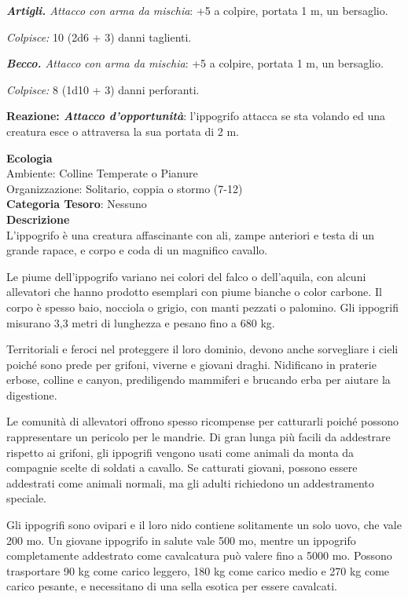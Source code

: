 \begin{multicols}{2}
{\emph{\textbf{Artigli.} Attacco con arma da mischia}: +5 a colpire, portata 1 m, un bersaglio.

\emph{Colpisce:} 10 (2d6 + 3) danni taglienti.

\emph{\textbf{Becco.} Attacco con arma da mischia}: +5 a colpire, portata 1 m, un bersaglio.

\emph{Colpisce:} 8 (1d10 + 3) danni perforanti.

\textbf{Reazione: \emph{Attacco d'opportunità}}: l'ippogrifo attacca se sta volando ed una creatura esce o attraversa la sua portata di 2 m.

\textbf{Ecologia}\\
Ambiente: Colline Temperate o Pianure\\
Organizzazione: Solitario, coppia o stormo (7-12)\\
\textbf{Categoria Tesoro}: Nessuno\\
\textbf{Descrizione}\\
L'ippogrifo è una creatura affascinante con ali, zampe anteriori e testa di un grande rapace, e corpo e coda di un magnifico cavallo.

Le piume dell'ippogrifo variano nei colori del falco o dell'aquila, con alcuni allevatori che hanno prodotto esemplari con piume bianche o color carbone. Il corpo è spesso baio, nocciola o grigio, con manti pezzati o palomino. Gli ippogrifi misurano 3,3 metri di lunghezza e pesano fino a 680 kg.

Territoriali e feroci nel proteggere il loro dominio, devono anche sorvegliare i cieli poiché sono prede per grifoni, viverne e giovani draghi. Nidificano in praterie erbose, colline e canyon, prediligendo mammiferi e brucando erba per aiutare la digestione.

Le comunità di allevatori offrono spesso ricompense per catturarli poiché possono rappresentare un pericolo per le mandrie. Di gran lunga più facili da addestrare rispetto ai grifoni, gli ippogrifi vengono usati come animali da monta da compagnie scelte di soldati a cavallo. Se catturati giovani, possono essere addestrati come animali normali, ma gli adulti richiedono un addestramento speciale.

Gli ippogrifi sono ovipari e il loro nido contiene solitamente un solo uovo, che vale 200 mo. Un giovane ippogrifo in salute vale 500 mo, mentre un ippogrifo completamente addestrato come cavalcatura può valere fino a 5000 mo. Possono trasportare 90 kg come carico leggero, 180 kg come carico medio e 270 kg come carico pesante, e necessitano di una sella esotica per essere cavalcati.

}
\end{multicols}
